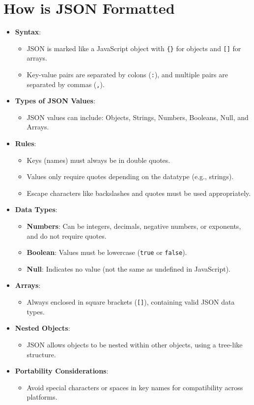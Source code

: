 \documentclass{article}
\begin{document}
\section{How is JSON Formatted}

\begin{itemize}
    \item \textbf{Syntax}:
    \begin{itemize}
        \item JSON is marked like a JavaScript object with \texttt{\{\}} for objects and \texttt{[]} for arrays.
        \item Key-value pairs are separated by colons (\texttt{:}), and multiple pairs are separated by commas (\texttt{,}).
    \end{itemize}
    \item \textbf{Types of JSON Values}:
    \begin{itemize}
        \item JSON values can include: Objects, Strings, Numbers, Booleans, Null, and Arrays.
    \end{itemize}
    \item \textbf{Rules}:
    \begin{itemize}
        \item Keys (names) must always be in double quotes.
        \item Values only require quotes depending on the datatype (e.g., strings).
        \item Escape characters like backslashes and quotes must be used appropriately.
    \end{itemize}
    \item \textbf{Data Types}:
    \begin{itemize}
        \item \textbf{Numbers}: Can be integers, decimals, negative numbers, or exponents, and do not require quotes.
        \item \textbf{Boolean}: Values must be lowercase (\texttt{true} or \texttt{false}).
        \item \textbf{Null}: Indicates no value (not the same as undefined in JavaScript).
    \end{itemize}
    \item \textbf{Arrays}:
    \begin{itemize}
        \item Always enclosed in square brackets (\texttt{[]}), containing valid JSON data types.
    \end{itemize}
    \item \textbf{Nested Objects}:
    \begin{itemize}
        \item JSON allows objects to be nested within other objects, using a tree-like structure.
    \end{itemize}
    \item \textbf{Portability Considerations}:
    \begin{itemize}
        \item Avoid special characters or spaces in key names for compatibility across platforms.
    \end{itemize}
\end{itemize}
\end{document}
